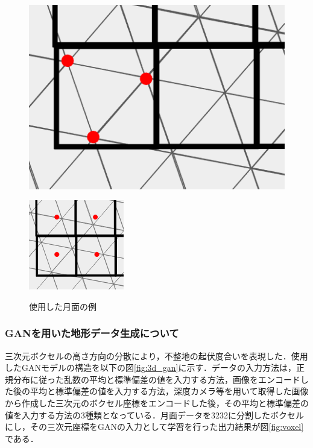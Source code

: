 \documentclass[uplatex,twocolumn, dvipdfmx]{jsarticle}  %
\begin{document}
\begin{figure}[t]
  \centering
  \begin{minipage}[b]{0.37\linewidth}
    \centering
    \includegraphics[keepaspectratio, scale=0.2]{images/mesh1.png}
    \label{fig:mesh1}
  \end{minipage}
  \begin{minipage}[b]{0.35\linewidth}
    \centering
    \includegraphics[keepaspectratio, scale=0.45]{images/mesh2.png}
    \label{fig:mesh2}
  \end{minipage}
  \caption{使用した月面の例}\label{fig:mesh_point}
\end{figure}


\subsubsection{GANを用いた地形データ生成について}
三次元ボクセルの高さ方向の分散により，不整地の起伏度合いを表現した．使用したGANモデルの構造を以下の図\ref{fig:3d_gan}に示す．データの入力方法は，正規分布に従った乱数の平均と標準偏差の値を入力する方法，画像をエンコードした後の平均と標準偏差の値を入力する方法，深度カメラ等を用いて取得した画像から作成した三次元のボクセル座標をエンコードした後，その平均と標準偏差の値を入力する方法の3種類となっている．月面データを32\times32に分割したボクセルにし，その三次元座標をGANの入力として学習を行った出力結果が図\ref{fig:voxel}である．
\end{document}

